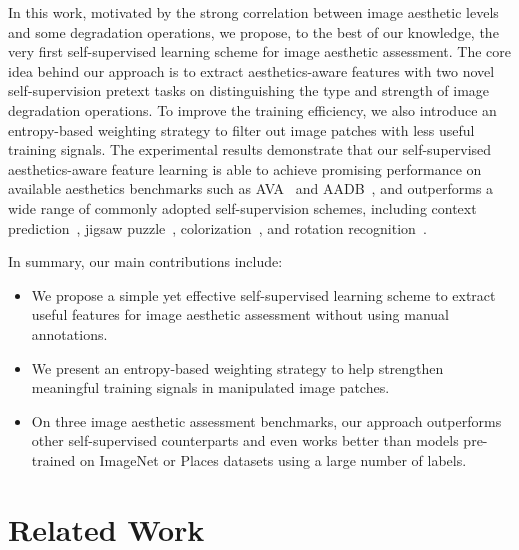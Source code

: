 \documentclass[letterpaper]{article}
\newcommand{\commentout}[1]{} %
\begin{document}
In this work, motivated by the strong correlation between image aesthetic levels and some degradation operations, we propose, to the best of our knowledge, the very first self-supervised learning scheme for image aesthetic assessment.
The core idea behind our approach is to extract aesthetics-aware features with two novel self-supervision pretext tasks on distinguishing the type and strength of image degradation operations.
To improve the training efficiency, we also introduce an entropy-based weighting strategy to filter out image patches with less useful training signals.
The experimental results demonstrate that our self-supervised aesthetics-aware feature learning is able to achieve promising performance on available aesthetics benchmarks such as AVA~\cite{murray2012ava} and AADB~\cite{kong2016photo}, and outperforms a wide range of commonly adopted self-supervision schemes, including context prediction~\cite{doersch2015unsupervised}, jigsaw puzzle~\cite{noroozi2016unsupervised}, colorization~\cite{larsson2017colorization,zhang2016colorful}, and rotation recognition~\cite{gidaris2018unsupervised}.

In summary, our main contributions include:
\begin{itemize}
\setlength{\itemsep}{0pt}
\setlength{\parskip}{0pt}
\setlength{\parsep}{0pt}
\item We propose a simple yet effective self-supervised learning scheme to extract useful features for image aesthetic assessment without using manual annotations.

\item We present an entropy-based weighting strategy to help strengthen meaningful training signals in manipulated image patches\commentout{ and promote training efficiency}.

\item On three image aesthetic assessment benchmarks, our approach outperforms other self-supervised counterparts and even works better than models pre-trained on ImageNet or Places datasets using a large number of labels.
\end{itemize}

\section{Related Work}
\end{document}
